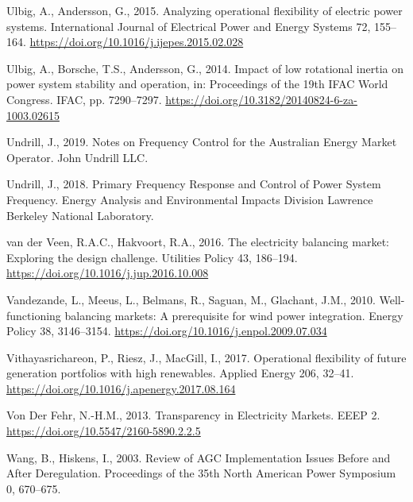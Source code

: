 \documentclass[12pt,a4paper,]{report}
\newlength{\cslhangindent}
\newenvironment{CSLReferences}[2] %
 {%
  \setlength{\parindent}{0pt}
  \ifodd #1 \everypar{\setlength{\hangindent}{\cslhangindent}}\ignorespaces\fi
  \ifnum #2 > 0
  \setlength{\parskip}{#2\baselineskip}
  \fi
 }%
 {}
\begin{document}
\begin{CSLReferences}{1}{0}
\leavevmode{}%
Ulbig, A., Andersson, G., 2015. Analyzing operational flexibility of
electric power systems. International Journal of Electrical Power and
Energy Systems 72, 155--164.
\url{https://doi.org/10.1016/j.ijepes.2015.02.028}

\leavevmode{}%
Ulbig, A., Borsche, T.S., Andersson, G., 2014. Impact of low rotational
inertia on power system stability and operation, in: Proceedings of the
19th {IFAC World Congress}. {IFAC}, pp. 7290--7297.
\url{https://doi.org/10.3182/20140824-6-za-1003.02615}

\leavevmode{}%
Undrill, J., 2019. Notes on {Frequency Control} for the {Australian
Energy Market Operator}. {John Undrill LLC}.

\leavevmode{}%
Undrill, J., 2018. Primary {Frequency Response} and {Control} of {Power
System Frequency}. Energy Analysis and Environmental Impacts Division
Lawrence Berkeley National Laboratory.

\leavevmode{}%
van der Veen, R.A.C., Hakvoort, R.A., 2016. The electricity balancing
market: {Exploring} the design challenge. Utilities Policy 43, 186--194.
\url{https://doi.org/10.1016/j.jup.2016.10.008}

\leavevmode{}%
Vandezande, L., Meeus, L., Belmans, R., Saguan, M., Glachant, J.M.,
2010. Well-functioning balancing markets: {A} prerequisite for wind
power integration. Energy Policy 38, 3146--3154.
\url{https://doi.org/10.1016/j.enpol.2009.07.034}

\leavevmode{}%
Vithayasrichareon, P., Riesz, J., MacGill, I., 2017. Operational
flexibility of future generation portfolios with high renewables.
Applied Energy 206, 32--41.
\url{https://doi.org/10.1016/j.apenergy.2017.08.164}

\leavevmode{}%
Von Der Fehr, N.-H.M., 2013. Transparency in {Electricity Markets}. EEEP
2. \url{https://doi.org/10.5547/2160-5890.2.2.5}

\leavevmode{}%
Wang, B., Hiskens, I., 2003. Review of {AGC Implementation Issues
Before} and {After Deregulation}. Proceedings of the 35th North American
Power Symposium 0, 670--675.


\end{CSLReferences}
\end{document}
